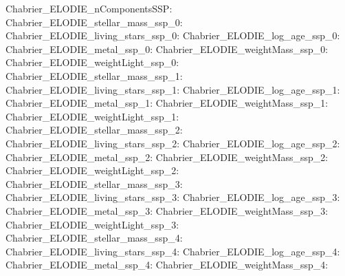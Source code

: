 Chabrier\_ELODIE\_nComponentsSSP:  \newline 
Chabrier\_ELODIE\_stellar\_mass\_ssp\_0:  \newline 
Chabrier\_ELODIE\_living\_stars\_ssp\_0:  \newline 
Chabrier\_ELODIE\_log\_age\_ssp\_0:  \newline 
Chabrier\_ELODIE\_metal\_ssp\_0:  \newline 
Chabrier\_ELODIE\_weightMass\_ssp\_0:  \newline 
Chabrier\_ELODIE\_weightLight\_ssp\_0:  \newline 
Chabrier\_ELODIE\_stellar\_mass\_ssp\_1:  \newline 
Chabrier\_ELODIE\_living\_stars\_ssp\_1:  \newline 
Chabrier\_ELODIE\_log\_age\_ssp\_1:  \newline 
Chabrier\_ELODIE\_metal\_ssp\_1:  \newline 
Chabrier\_ELODIE\_weightMass\_ssp\_1:  \newline 
Chabrier\_ELODIE\_weightLight\_ssp\_1:  \newline 
Chabrier\_ELODIE\_stellar\_mass\_ssp\_2:  \newline 
Chabrier\_ELODIE\_living\_stars\_ssp\_2:  \newline 
Chabrier\_ELODIE\_log\_age\_ssp\_2:  \newline 
Chabrier\_ELODIE\_metal\_ssp\_2:  \newline 
Chabrier\_ELODIE\_weightMass\_ssp\_2:  \newline 
Chabrier\_ELODIE\_weightLight\_ssp\_2:  \newline 
Chabrier\_ELODIE\_stellar\_mass\_ssp\_3:  \newline 
Chabrier\_ELODIE\_living\_stars\_ssp\_3:  \newline 
Chabrier\_ELODIE\_log\_age\_ssp\_3:  \newline 
Chabrier\_ELODIE\_metal\_ssp\_3:  \newline 
Chabrier\_ELODIE\_weightMass\_ssp\_3:  \newline 
Chabrier\_ELODIE\_weightLight\_ssp\_3:  \newline 
Chabrier\_ELODIE\_stellar\_mass\_ssp\_4:  \newline 
Chabrier\_ELODIE\_living\_stars\_ssp\_4:  \newline 
Chabrier\_ELODIE\_log\_age\_ssp\_4:  \newline 
Chabrier\_ELODIE\_metal\_ssp\_4:  \newline 
Chabrier\_ELODIE\_weightMass\_ssp\_4:  \newline 
